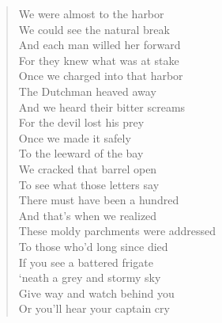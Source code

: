 \documentclass[11pt]{article}
\begin{document}
\begin{verse}
We were almost to the harbor\\
We could see the natural break\\
And each man willed her forward\\
For they knew what was at stake\\
\vspace*{1em}
Once we charged into that harbor\\
The Dutchman heaved away\\
And we heard their bitter screams\\
For the devil lost his prey\\
Once we made it safely\\
To the leeward of the bay\\
We cracked that barrel open\\
To see what those letters say\\
There must have been a hundred\\
And that's when we realized\\
These moldy parchments were addressed\\
To those who'd long since died\\
If you see a battered frigate\\
‘neath a grey and stormy sky\\
Give way and watch behind you\\
Or you'll hear your captain cry\\
\end{verse}
\end{document}
